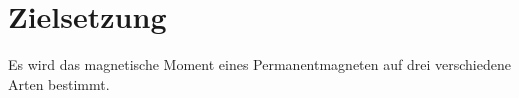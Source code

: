 \section{Zielsetzung}
\label{sec:Zielsetzung}

Es wird das magnetische Moment eines Permanentmagneten auf drei verschiedene Arten bestimmt.